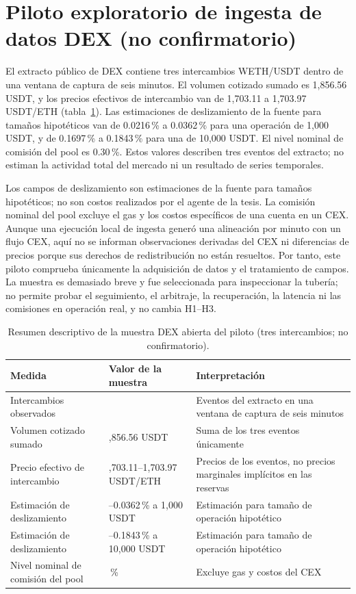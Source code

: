 \section{Piloto exploratorio de ingesta de datos DEX (no confirmatorio)}
\label{sec:dex-pilot-results}

El extracto público de DEX contiene tres intercambios WETH/USDT dentro de una ventana de captura de seis minutos. El volumen cotizado sumado es 1,856.56 USDT, y los precios efectivos de intercambio van de 1,703.11 a 1,703.97 USDT/ETH (tabla~\ref{tab:dex-pilot}). Las estimaciones de deslizamiento de la fuente para tamaños hipotéticos van de 0.0216\,\% a 0.0362\,\% para una operación de 1,000 USDT, y de 0.1697\,\% a 0.1843\,\% para una de 10,000 USDT. El nivel nominal de comisión del pool es 0.30\,\%. Estos valores describen tres eventos del extracto; no estiman la actividad total del mercado ni un resultado de series temporales.

Los campos de deslizamiento son estimaciones de la fuente para tamaños hipotéticos; no son costos realizados por el agente de la tesis. La comisión nominal del pool excluye el gas y los costos específicos de una cuenta en un CEX. Aunque una ejecución local de ingesta generó una alineación por minuto con un flujo CEX, aquí no se informan observaciones derivadas del CEX ni diferencias de precios porque sus derechos de redistribución no están resueltos. Por tanto, este piloto comprueba únicamente la adquisición de datos y el tratamiento de campos. La muestra es demasiado breve y fue seleccionada para inspeccionar la tubería; no permite probar el seguimiento, el arbitraje, la recuperación, la latencia ni las comisiones en operación real, y no cambia H1--H3.

\begin{table}[htbp]
\centering
\caption{Resumen descriptivo de la muestra DEX abierta del piloto (tres intercambios; no confirmatorio).}
\label{tab:dex-pilot}
\small
\begin{tabularx}{\textwidth}{@{}>{\raggedright\arraybackslash}p{}>{\raggedright\arraybackslash}p{}X@{}}
\toprule
Medida & Valor de la muestra & Interpretación \\
\midrule
Intercambios observados & 3 & Eventos del extracto en una ventana de captura de seis minutos \\
Volumen cotizado sumado & 1,856.56 USDT & Suma de los tres eventos únicamente \\
Precio efectivo de intercambio & 1,703.11--1,703.97 USDT/ETH & Precios de los eventos, no precios marginales implícitos en las reservas \\
Estimación de deslizamiento & 0.0216--0.0362\,\% a 1,000 USDT & Estimación para tamaño de operación hipotético \\
Estimación de deslizamiento & 0.1697--0.1843\,\% a 10,000 USDT & Estimación para tamaño de operación hipotético \\
Nivel nominal de comisión del pool & 0.30\,\% & Excluye gas y costos del CEX \\
\bottomrule
\end{tabularx}
\end{table}

